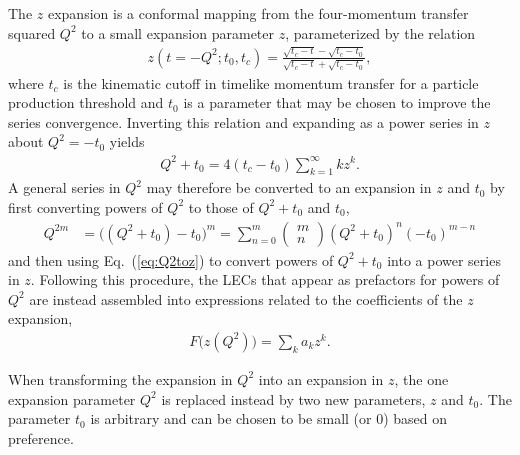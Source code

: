 The $z$ expansion is a conformal mapping from the four-momentum transfer squared $Q^2$
 to a small expansion parameter $z$, parameterized by the relation
\begin{align}
 z(t=-Q^2;t_0,t_c) = \frac{\sqrt{t_c-t} -\sqrt{t_c-t_0}}{ \sqrt{t_c-t} +\sqrt{t_c-t_0}},
\end{align}
 where $t_c$ is the kinematic cutoff in timelike momentum transfer for
 a particle production threshold and $t_0$ is a parameter that may be
 chosen to improve the series convergence.
Inverting this relation and expanding as a power series in $z$ about $Q^2=-t_0$ yields
\begin{align}
 Q^2+t_0 = 4 (t_c-t_0) \sum_{k=1}^\infty k z^k.
 \label{eq:Q2toz}
\end{align}
A general series in $Q^2$ may therefore be converted to an expansion in $z$ and $t_0$
 by first converting powers of $Q^2$ to those of $Q^2+t_0$ and $t_0$,
\begin{align}
 Q^{2m} &= \big( (Q^2+t_0) -t_0 \big)^m
 = \sum_{n=0}^{m} \left( \begin{array}{c} m \\ n \end{array} \right) (Q^2+t_0)^n (-t_0)^{m-n}
\end{align}
 and then using Eq.~(\ref{eq:Q2toz}) to convert powers of $Q^2+t_0$ into a power series in $z$.
Following this procedure, the LECs that appear as prefactors for powers of $Q^2$
 are instead assembled into expressions related to the coefficients of the $z$ expansion,
\begin{align}
 F\big(z(Q^2)\big) = \sum_k a_k z^k.
 \label{eq:zexp}
\end{align}

When transforming the expansion in $Q^2$ into an expansion in $z$,
 the one expansion parameter $Q^2$ is replaced instead by two new parameters, $z$ and $t_0$.
The parameter $t_0$ is arbitrary and can be chosen to be small (or 0) based on preference.


